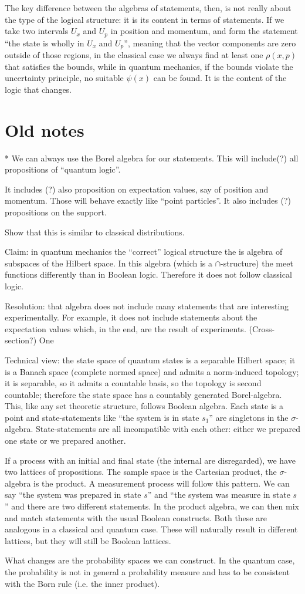 \documentclass[10pt,twocolumn, nofootinbib]{revtex4-1}
\begin{document}
The key difference between the algebras of statements, then, is not really about the type of the logical structure: it is its content in terms of statements. If we take two intervals $U_x$ and $U_p$ in position and momentum, and form the statement ``the state is wholly in $U_x$ and $U_p$'', meaning that the vector components are zero outside of those regions, in the classical case we always find at least one $\rho(x,p)$ that satisfies the bounds, while in quantum mechanics, if the bounds violate the uncertainty principle, no suitable $\psi(x)$ can be found. It is the content of the logic that changes. 

\section{Old notes}

* We can always use the Borel algebra for our statements. This will include(?) all propositions of ``quantum logic''.

It includes (?) also proposition on expectation values, say of position and momentum. Those will behave exactly like ``point particles''. It also includes (?) propositions on the support.

Show that this is similar to classical distributions.


Claim: in quantum mechanics the ``correct'' logical structure the is algebra of subspaces of the Hilbert space. In this algebra (which is a $\cap$-structure) the meet functions differently than in Boolean logic. Therefore it does not follow classical logic.

Resolution: that algebra does not include many statements that are interesting experimentally. For example, it does not include statements about the expectation values which, in the end, are the result of experiments. (Cross-section?) One 


Technical view: the state space of quantum states is a separable Hilbert space; it is a Banach space (complete normed space) and admits a norm-induced topology; it is separable, so it admits a countable basis, so the topology is second countable; therefore the state space has a countably generated Borel-algebra. This, like any set theoretic structure, follows Boolean algebra. Each state is a point and state-statements like ``the system is in state $s_1$'' are singletons in the $\sigma$-algebra. State-statements are all incompatible with each other: either we prepared one state or we prepared another.

If a process with an initial and final state (the internal are disregarded), we have two lattices of propositions. The sample space is the Cartesian product, the $\sigma$-algebra is the product. A measurement process will follow this pattern. We can say ``the system was prepared in state $s$'' and ``the system was measure in state $s$'' and there are two different statements. In the product algebra, we can then mix and match statements with the usual Boolean constructs. Both these are analogous in a classical and quantum case. These will naturally result in different lattices, but they will still be Boolean lattices.

What changes are the probability spaces we can construct. In the quantum case, the probability is not in general a probability measure and has to be consistent with the Born rule (i.e. the inner product).



\end{document}
